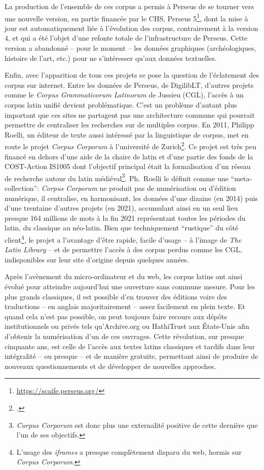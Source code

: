 La production de l'ensemble de ces corpus a permis à Perseus de se tourner vers une nouvelle version, en partie financée par le CHS, Perseus 5\footnote{\url{https://scaife.perseus.org/}}, dont la mise à jour est automatiquement liée à l'évolution des corpus, contrairement à la version 4, et qui a été l'objet d'une refonte totale de l'infrastructure de Perseus. Cette version a abandonné -- pour le moment -- les données graphiques (archéologiques, histoire de l'art, etc.) pour ne s'intéresser qu'aux données textuelles.

Enfin, avec l'apparition de tous ces projets se pose la question de l'éclatement des corpus sur internet. Entre les données de Perseus, de DigilibLT, d'autres projets comme le \textit{Corpus Grammaticorum Latinorum} de Jussieu (CGL), l'accès à un corpus latin unifié devient problématique. C'est un problème d'autant plus important que ces sites ne partagent pas une architecture commune qui pourrait permettre de centraliser les recherches sur de multiples corpus. En 2011, Philipp Roelli, un éditeur de texte aussi intéressé par la linguistique de corpus, met en route le projet \textit{Corpus Corporum} à l'université de Zurich\footcite{roelli2014corpus}. Ce projet est très peu financé en dehors d'une aide de la chaire de latin et d'une partie des fonds de la COST-Action IS1005 dont l'objectif principal était la formalisation d'un réseau de recherche autour du latin médiéval\footnote{\textit{Corpus Corporum} est donc plus une externalité positive de cette dernière que l'un de ses objectifs.}. Ph.~Roelli le définit comme une ``meta-collection'': \textit{Corpus Corporum} ne produit pas de numérisation ou d'édition numérique, il centralise, en harmonisant, les données d'une dizaine (en 2014) puis d'une trentaine d'autres projets (en 2021), accumulant ainsi en un seul lieu presque 164 millions de mots à la fin 2021 représentant toutes les périodes du latin, du classique au néo-latin. Bien que techniquement ``rustique'' du côté client\footnote{L'usage des \textit{iframes} a presque complètement disparu du web, hormis sur \textit{Corpus Corporum}.}, le projet a l'avantage d'être rapide, facile d'usage -- à l'image de \textit{The Latin Library} -- et de permettre l'accès à des corpus perdus comme les CGL, indisponibles sur leur site d'origine depuis quelques années.

Après l'avènement du micro-ordinateur et du web, les corpus latins ont ainsi évolué pour atteindre aujourd'hui une ouverture sans commune mesure. Pour les plus grands classiques, il est possible d'en trouver des éditions voire des traductions -- en anglais majoritairement -- assez facilement en plein texte. Et quand cela n'est pas possible, on peut toujours faire recours aux dépôts institutionnels ou privés tels qu'Archive.org ou HathiTrust aux États-Unis afin d'obtenir la numérisation d'un de ces ouvrages. Cette révolution, sur presque cinquante ans, est celle de l'accès aux textes latins classiques et tardifs dans leur intégralité -- ou presque -- et de manière gratuite, permettant ainsi de produire de nouveaux questionnements et de développer de nouvelles approches.

